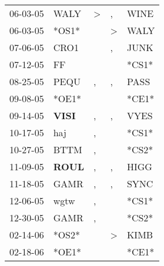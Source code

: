 \begin{supertabular}{p{0.07\textwidth}p{0.06\textwidth}p{0.02\textwidth}p{0.02\textwidth}p{0.06\textwidth}}
          06-03-05\textsuperscript{} &           WALY\textsuperscript{} &     \textgreater &             , &           WINE\textsuperscript{} \\
          06-03-05\textsuperscript{} &                            *OS1* &                  &  \textgreater &           WALY\textsuperscript{} \\
          07-06-05\textsuperscript{} &           CRO1\textsuperscript{} &                  &             , &           JUNK\textsuperscript{} \\
          07-12-05\textsuperscript{} &             FF\textsuperscript{} &                  &               &                            *CS1* \\
          08-25-05\textsuperscript{} &           PEQU\textsuperscript{} &                , &             , &           PASS\textsuperscript{} \\
          09-08-05\textsuperscript{} &                            *OE1* &                  &               &                            *CE1* \\
          09-14-05\textsuperscript{} &  \textbf{VISI\textsuperscript{}} &                , &             , &           VYES\textsuperscript{} \\
          10-17-05\textsuperscript{} &            haj\textsuperscript{} &                , &               &                            *CS1* \\
          10-27-05\textsuperscript{} &           BTTM\textsuperscript{} &                , &               &                            *CS2* \\
          11-09-05\textsuperscript{} &  \textbf{ROUL\textsuperscript{}} &                , &             , &           HIGG\textsuperscript{} \\
          11-18-05\textsuperscript{} &           GAMR\textsuperscript{} &                , &             , &           SYNC\textsuperscript{} \\
          12-06-05\textsuperscript{} &           wgtw\textsuperscript{} &                , &               &                            *CS1* \\
          12-30-05\textsuperscript{} &           GAMR\textsuperscript{} &                , &               &                            *CS2* \\
          02-14-06\textsuperscript{} &                            *OS2* &                  &  \textgreater &           KIMB\textsuperscript{} \\
          02-18-06\textsuperscript{} &                            *OE1* &                  &               &                            *CE1* \\

\end{supertabular}
